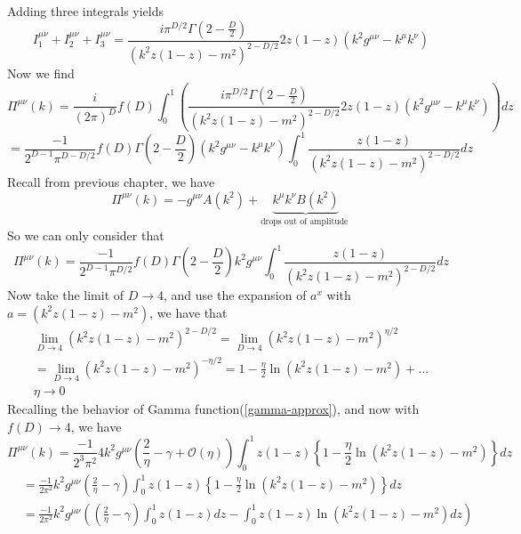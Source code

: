 Adding three integrals yields
\begin{equation}I_{1}^{\mu \nu}+I_{2}^{\mu \nu}+I_{3}^{\mu \nu}=\frac{i \pi^{D / 2} \Gamma\left(2-\frac{D}{2}\right)}{\left(k^{2} z(1-z)-m^{2}\right)^{2-D / 2}} 2 z(1-z)\left(k^{2} g^{\mu \nu}-k^{\mu} k^{\nu}\right)
\end{equation}
Now we find
$$\Pi^{\mu \nu}(k)=\frac{i}{(2 \pi)^{D}} f(D) \int_{0}^{1}\left(\frac{i \pi^{D / 2} \Gamma\left(2-\frac{D}{2}\right)}{\left(k^{2} z(1-z)-m^{2}\right)^{2-D / 2}} 2 z(1-z)\left(k^{2} g^{\mu \nu}-k^{\mu} k^{\nu}\right)\right) d z$$
$$=\frac{-1}{2^{D-1} \pi^{D-D / 2}} f(D) \Gamma\left(2-\frac{D}{2}\right)\left(k^{2} g^{\mu \nu}-k^{\mu} k^{\nu}\right) \int_{0}^{1} \frac{z(1-z)}{\left(k^{2} z(1-z)-m^{2}\right)^{2-D / 2}} d z$$
Recall from previous chapter, we have
\begin{equation}\Pi^{\mu \nu}(k)=-g^{\mu \nu} A\left(k^{2}\right)+\underbrace{k^{\mu} k^{\nu} B\left(k^{2}\right)}_{\text {drops out of amplitude }}\end{equation}
\textbf{} So we can only consider that 
\begin{equation}\Pi^{\mu \nu}(k)=\frac{-1}{2^{D-1} \pi^{D / 2}} f(D) \Gamma\left(2-\frac{D}{2}\right) k^{2} g^{\mu \nu} \int_{0}^{1} \frac{z(1-z)}{\left(k^{2} z(1-z)-m^{2}\right)^{2-D / 2}} d z\end{equation}
Now take the limit of $D\rightarrow4$, and use the expansion of $a^x$ with $a=(k^2z(1-z)-m^2)$, we have that
\begin{equation}\begin{array}{l}
\lim _{D \rightarrow 4} \left(k^{2} z(1-z)-m^{2}\right)^{2-D / 2}=\lim _{D \rightarrow 4}\left(k^{2} z(1-z)-m^{2}\right)^{\eta / 2} \\
=\lim _{D \rightarrow 4}\left(k^{2} z(1-z)-m^{2}\right)^{-\eta / 2}=1-\frac{\eta}{2} \ln \left(k^{2} z(1-z)-m^{2}\right)+\ldots \\
\eta \rightarrow 0
\end{array}\end{equation}
Recalling the behavior of Gamma function(\ref{gamma-approx}), and now with $f(D)\rightarrow4$, we have
$$\Pi^{\mu \nu}(k)=\frac{-1}{2^{3} \pi^{2}} 4 k^{2} g^{\mu \nu}\left(\frac{2}{\eta}-\gamma+\mathcal{O}(\eta)\right) \int_{0}^{1} z(1-z)\left\{1-\frac{\eta}{2} \ln \left(k^{2} z(1-z)-m^{2}\right)\right\} d z$$
$$\begin{aligned}
&=\frac{-1}{2 \pi^{2}} k^{2} g^{\mu \nu}\left(\frac{2}{\eta}-\gamma\right) \int_{0}^{1} z(1-z)\left\{1-\frac{\eta}{2} \ln \left(k^{2} z(1-z)-m^{2}\right)\right\} d z\\
&=\frac{-1}{2 \pi^{2}} k^{2} g^{\mu \nu}\left(\left(\frac{2}{\eta}-\gamma\right) \int_{0}^{1} z(1-z) d z-\int_{0}^{1} z(1-z) \ln \left(k^{2} z(1-z)-m^{2}\right) d z\right)
\end{aligned}$$
